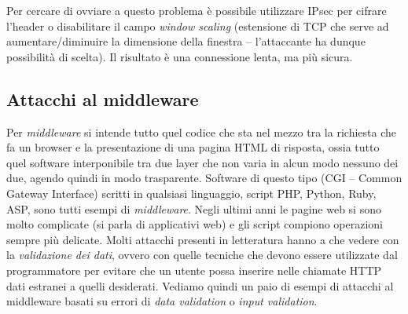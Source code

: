 Per cercare di ovviare a questo problema è possibile utilizzare IPsec per cifrare l'header o disabilitare il campo \textit{window scaling} (estensione di TCP che serve ad aumentare/diminuire la dimensione della finestra -- l'attaccante ha dunque possibilità di scelta). Il risultato è una connessione lenta, ma più sicura.

\subsection{Attacchi al middleware}
Per \textit{middleware} si intende tutto quel codice che sta nel mezzo tra la richiesta che fa un browser e la presentazione di una pagina HTML di risposta, ossia tutto quel software interponibile tra due layer che non varia in alcun modo nessuno dei due, agendo quindi in modo trasparente. Software di questo tipo (CGI -- Common Gateway Interface) scritti in qualsiasi linguaggio, script PHP, Python, Ruby, ASP, sono tutti esempi di \textit{middleware}. Negli ultimi anni le pagine web si sono molto complicate (si parla di applicativi web) e gli script compiono operazioni sempre più delicate. Molti attacchi presenti in letteratura hanno a che vedere con la \textit{validazione dei dati}, ovvero con quelle tecniche che devono essere utilizzate dal programmatore per evitare che un utente possa inserire nelle chiamate HTTP dati estranei a quelli desiderati. Vediamo quindi un paio di esempi di attacchi al middleware basati su errori di \textit{data validation} o \textit{input validation}.


